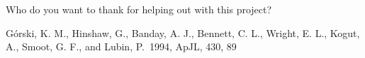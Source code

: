 \documentclass{emulateapj}
\begin{document}
\begin{acknowledgements}
  Who do you want to thank for helping out with this project?
\end{acknowledgements}

\begin{thebibliography}{}

 G{\'o}rski, K. M.,
  Hinshaw, G., Banday, A. J., Bennett, C. L., Wright, E. L., Kogut,
  A., Smoot, G. F., and Lubin, P.\ 1994, ApJL, 430, 89

\end{thebibliography}
\end{document}
